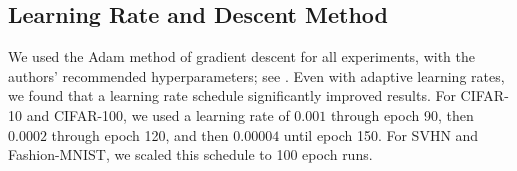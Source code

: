 \documentclass{article} %
\begin{document}

\subsection{Learning Rate and Descent Method}

We used the Adam method of gradient descent for all experiments, with the authors' recommended hyperparameters; see \cite{Adam}. Even with adaptive learning rates, we found that a learning rate schedule significantly improved results. For CIFAR-10 and CIFAR-100, we used a learning rate of $0.001$ through epoch 90, then $0.0002$ through epoch 120, and then $0.00004$ until epoch 150. For SVHN and Fashion-MNIST, we scaled this schedule to 100 epoch runs.

\end{document}
